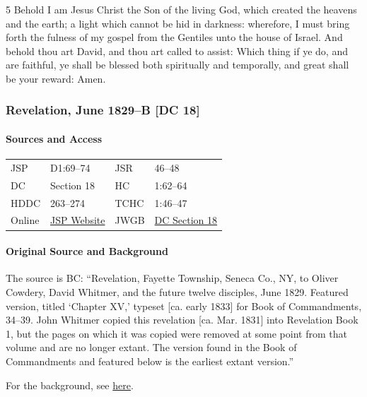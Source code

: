 				5 Behold I am Jesus Christ the Son of the living God, which created the heavens and the earth; a light which cannot be hid in darkness: wherefore, I must bring forth the fulness of my gospel from the Gentiles unto the house of Israel. And behold thou art David, and thou art called to assist: Which thing if ye do, and are faithful, ye shall be blessed both spiritually and temporally, and great shall be your reward: Amen.
			
		\subsubsection{Revelation, June 1829--B [DC 18]}
			\label{EMS-1828-1829-JS-JUN-1829-B}
			
			\paragraph{Sources and Access}

				\begin{tabular}{p{1in}p{1.5in}p{1in}p{1.5in}}
				JSP	 	& D1:69--74		& JSR 		& 46--48	 \\  
				DC	 	& Section 18 	& HC 		& 1:62--64	 \\
				HDDC 	& 263--274 		& TCHC 		& 1:46--47	 \\
				Online  & \href{https://www.josephsmithpapers.org/paper-summary/revelation-june-1829-b-dc-18/1}{JSP Website} & 
				JWGB	& \hyperref[DC18]{DC Section 18} \\
				\end{tabular}
			
			\paragraph{Original Source and Background}
			
				The source is BC: ``Revelation, Fayette Township, Seneca Co., NY, to Oliver Cowdery, David Whitmer, and the future twelve disciples, June 1829. Featured version, titled `Chapter XV,' typeset [ca. early 1833] for Book of Commandments, 34--39. John Whitmer copied this revelation [ca. Mar. 1831] into Revelation Book 1, but the pages on which it was copied were removed at some point from that volume and are no longer extant. The version found in the Book of Commandments and featured below is the earliest extant version.''
				
				For the background, see \hyperref[DC18-HB]{here}.
			
